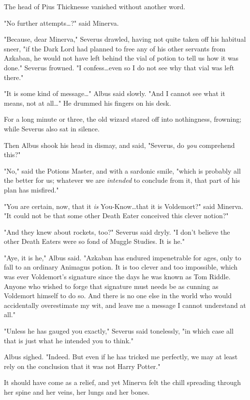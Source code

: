 The head of Pius Thicknesse vanished without another word.

"No further attempts…?" said Minerva.

"Because, dear Minerva," Severus drawled, having not quite taken off his
habitual sneer, "if the Dark Lord had planned to free any of his other servants
from Azkaban, he would not have left behind the vial of potion to tell us how
it was done." Severus frowned. "I confess…even so I do not see why that
vial was left there."

"It is some kind of message…" Albus said slowly. "And I cannot see what
it means, not at all…" He drummed his fingers on his desk.

For a long minute or three, the old wizard stared off into nothingness,
frowning; while Severus also sat in silence.

Then Albus shook his head in dismay, and said, "Severus, do \emph{you}
comprehend this?"

"No," said the Potions Master, and with a sardonic smile, "which is probably
all the better for us; whatever we are \emph{intended} to conclude from it,
that part of his plan has misfired."

"You are certain, now, that it \emph{is} You-Know…that it is
Voldemort?" said Minerva. "It could not be that some other Death Eater
conceived this clever notion?"

"And they knew about rockets, too?" Severus said dryly. "I don't believe the
other Death Eaters were so fond of Muggle Studies. It is he."

"Aye, it is he," Albus said. "Azkaban has endured impenetrable for ages, only
to fall to an ordinary Animagus potion. It is too clever and too impossible,
which was ever Voldemort's signature since the days he was known as Tom Riddle.
Anyone who wished to forge that signature must needs be as cunning as Voldemort
himself to do so. And there is no one else in the world who would accidentally
overestimate my wit, and leave me a message I cannot understand at all."

"Unless he has gauged you exactly," Severus said tonelessly, "in which case all
that is just what he intended you to think."

Albus sighed. "Indeed. But even if he has tricked me perfectly, we may at least
rely on the conclusion that it was not Harry Potter."

It should have come as a relief, and yet Minerva felt the chill spreading
through her spine and her veins, her lungs and her bones.

